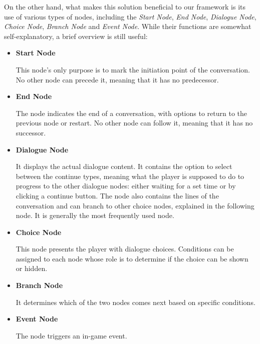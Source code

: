 On the other hand, what makes this solution beneficial to our framework is its use of various types of nodes, including the \textit{Start Node}, \textit{End Node}, \textit{Dialogue Node}, \textit{Choice Node}, \textit{Branch Node} and \textit{Event Node}. While their functions are somewhat self-explanatory, a brief overview is still useful:

\begin{itemize}
    \item \textbf{Start Node}
    
This node's only purpose is to mark the initiation point of the conversation. No other node can precede it, meaning that it has no predecessor.

    \item \textbf{End Node}

The node indicates the end of a conversation, with options to return to the previous node or restart. No other node can follow it, meaning that it has no successor.

    \item \textbf{Dialogue Node}

It displays the actual dialogue content. It contains the option to select between the continue types, meaning what the player is supposed to do to progress to the other dialogue nodes: either waiting for a set time or by clicking a continue button. The node also contains the lines of the conversation and can branch to other choice nodes, explained in the following node. It is generally the most frequently used node.

    \item \textbf{Choice Node}

This node presents the player with dialogue choices. Conditions can be assigned to each node whose role is to determine if the choice can be shown or hidden.

    \item \textbf{Branch Node}

It determines which of the two nodes comes next based on specific conditions.

    \item \textbf{Event Node}

The node triggers an in-game event.
\end{itemize}

